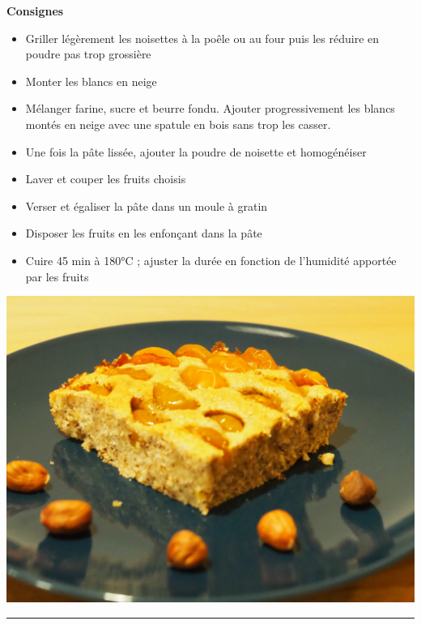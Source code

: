 \documentclass[]{book}
\providecommand{\tightlist}{%
  \setlength{\itemsep}{0pt}\setlength{\parskip}{0pt}}
\begin{document}
\textbf{Consignes}

\begin{itemize}
\tightlist
\item
  Griller légèrement les noisettes à la poêle ou au four puis les
  réduire en poudre pas trop grossière
\item
  Monter les blancs en neige
\item
  Mélanger farine, sucre et beurre fondu. Ajouter progressivement les
  blancs montés en neige avec une spatule en bois sans trop les casser.
\item
  Une fois la pâte lissée, ajouter la poudre de noisette et homogénéiser
\item
  Laver et couper les fruits choisis
\item
  Verser et égaliser la pâte dans un moule à gratin
\item
  Disposer les fruits en les enfonçant dans la pâte
\item
  Cuire 45 min à 180°C ; ajuster la durée en fonction de l'humidité
  apportée par les fruits
\end{itemize}

\begin{center}\includegraphics[width=0.9\linewidth]{photos/creusois} \end{center}

\begin{center}\rule{0.5\linewidth}{0.5pt}\end{center}
\end{document}
